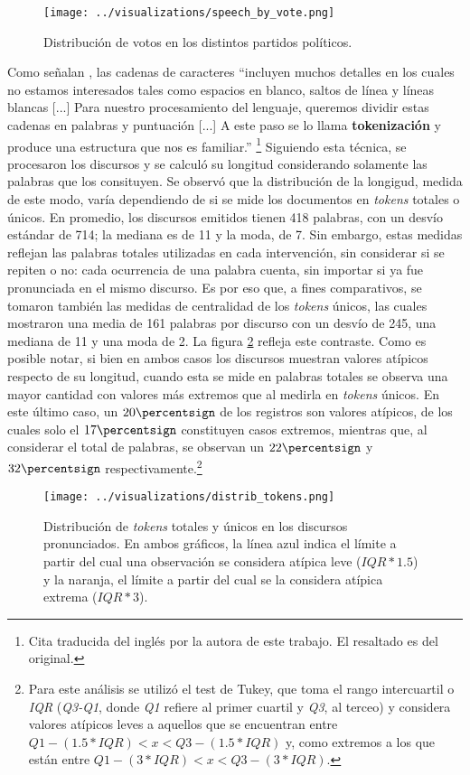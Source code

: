 \begin{figure}[h!]
    \centering
    \texttt{[image: ../visualizations/speech\_by\_vote.png]}
    \caption{Distribuci\'on de votos en los distintos partidos pol\'iticos.}%
    \label{fig-distrib-speech}
\end{figure}

Como señalan \cite{bird2009natural}, las cadenas de caracteres ``incluyen muchos detalles
en los cuales no estamos interesados tales como espacios en blanco, saltos de l\'inea
y l\'ineas blancas [...] Para nuestro procesamiento del lenguaje, queremos dividir
estas cadenas en palabras y puntuaci\'on  [...] A este paso se lo llama
\textbf{tokenizaci\'on} y produce una estructura que nos es familiar.''
\footnote{Cita traducida del ingl\'es por la autora de este trabajo.
El resaltado es del original.}
Siguiendo esta t\'ecnica, se procesaron los discursos y se calcul\'o su
longitud considerando solamente las palabras que los consituyen.
Se observ\'o que la distribuci\'on de la longigud, medida de este modo, var\'ia
dependiendo de si se mide los documentos en \textit{tokens} totales o \'unicos.
En promedio, los discursos emitidos tienen 418 palabras, con un desv\'io
est\'andar de 714; la mediana es de 11 y la moda, de 7. Sin embargo, estas medidas
reflejan las palabras totales utilizadas en cada intervenci\'on, sin considerar si se repiten
o no: cada ocurrencia de una palabra cuenta, sin importar si ya fue pronunciada en el mismo
discurso. Es por eso que, a fines comparativos, se tomaron tambi\'en las medidas de centralidad
de los \textit{tokens} \'unicos, las cuales mostraron una media de 161 palabras por discurso
con un desv\'io de 245, una mediana de 11 y una moda de 2. La figura \ref{fig-distrib-tokens}
refleja este contraste. Como es posible notar, si bien en ambos casos los discursos
muestran valores at\'ipicos respecto de su longitud, cuando esta se mide en palabras
totales se observa una mayor cantidad con valores m\'as extremos que
al medirla en \textit{tokens} \'unicos. En este \'ultimo caso, un
$20\percentsign$ de los registros son valores at\'ipicos, de los cuales solo el
$17\percentsign$ constituyen casos extremos, mientras que, al considerar
el total de palabras, se observan un $22\percentsign$ y $32\percentsign$
respectivamente.\footnote{Para este an\'alisis se utiliz\'o el
test de Tukey, que toma el rango intercuartil o \textit{IQR} (\textit{Q3-Q1}, donde
\textit{Q1} refiere al primer cuartil y \textit{Q3}, al terceo) y considera
valores at\'ipicos leves a aquellos que se encuentran entre
$Q1 - (1.5 * IQR) < x < Q3 - (1.5 * IQR)$ y, como extremos a los que est\'an entre
$Q1 - (3 * IQR) < x < Q3 - (3 * IQR)$.}

\begin{figure}[h!]%
    \centering%
    \texttt{[image: ../visualizations/distrib\_tokens.png]}%
    \caption{Distribuci\'on de \textit{tokens} totales y \'unicos en los discursos pronunciados. En ambos gr\'aficos,
    la l\'inea azul indica el l\'imite a partir del cual una observaci\'on se considera at\'ipica leve
    ($IQR*1.5$) y la naranja, el l\'imite a partir del cual se la considera at\'ipica extrema ($IQR*3$).}%
    \label{fig-distrib-tokens}%
\end{figure}%
